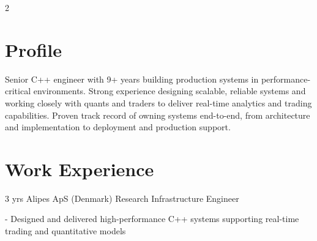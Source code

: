 \documentclass[11pt]{article} %
\begin{document}
\begin{paracol}{2}
\switchcolumn

\section{Profile}
Senior C++ engineer with 9+ years building production systems in performance-critical environments. Strong experience designing scalable, reliable systems and working closely with quants and traders to deliver real-time analytics and trading capabilities. Proven track record of owning systems end-to-end, from architecture and implementation to deployment and production support.

\medskip %






\section{Work Experience}




{3 yrs} %
{Alipes ApS (Denmark)} %
{Research Infrastructure Engineer} %
{- Designed and delivered high-performance C++ systems supporting real-time trading and quantitative models

}
\end{paracol}
\end{document}
